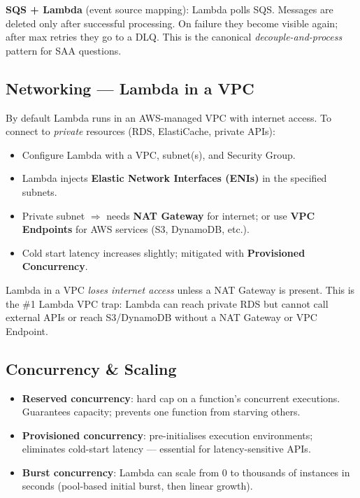 \begin{examtip}
\textbf{SQS + Lambda} (event source mapping): Lambda polls SQS. Messages are deleted only
after successful processing. On failure they become visible again; after max retries they
go to a DLQ. This is the canonical \emph{decouple-and-process} pattern for SAA questions.
\end{examtip}

\subsection{Networking --- Lambda in a VPC}

By default Lambda runs in an AWS-managed VPC with internet access.
To connect to \emph{private} resources (RDS, ElastiCache, private APIs):

\begin{itemize}
  \item Configure Lambda with a VPC, subnet(s), and Security Group.
  \item Lambda injects \textbf{Elastic Network Interfaces (ENIs)} in the specified subnets.
  \item Private subnet $\Rightarrow$ needs \textbf{NAT Gateway} for internet; or use
        \textbf{VPC Endpoints} for AWS services (S3, DynamoDB, etc.).
  \item Cold start latency increases slightly; mitigated with \textbf{Provisioned Concurrency}.
\end{itemize}

\begin{gotcha}
Lambda in a VPC \emph{loses internet access} unless a NAT Gateway is present.
This is the \#1 Lambda VPC trap: Lambda can reach private RDS but cannot call
external APIs or reach S3/DynamoDB without a NAT Gateway or VPC Endpoint.
\end{gotcha}

\subsection{Concurrency \& Scaling}

\begin{itemize}
  \item \textbf{Reserved concurrency}: hard cap on a function's concurrent executions.
        Guarantees capacity; prevents one function from starving others.
  \item \textbf{Provisioned concurrency}: pre-initialises execution environments;
        eliminates cold-start latency --- essential for latency-sensitive APIs.
  \item \textbf{Burst concurrency}: Lambda can scale from 0 to thousands of instances
        in seconds (pool-based initial burst, then linear growth).
\end{itemize}

